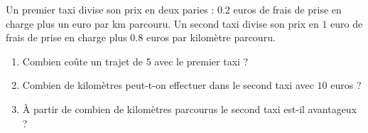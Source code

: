 
\begin{exercice}\label{exosmath-0086}

Un premier taxi divise son prix en deux paries : $0.2$ euros de frais de prise en charge plus un euro par km parcouru. Un second taxi divise son prix en $1$ euro de frais de prise en charge plus $0.8$ euros par kilomètre parcouru.

\begin{enumerate}
    \item
        Combien coûte un trajet de \unit{5}{\kilo\meter} avec le premier taxi ?
    \item
        Combien de kilomètres peut-t-on effectuer dans le second taxi avec \( 10\) euros ?
    \item
        À partir de combien de kilomètres parcourus le second taxi est-il avantageux ?
\end{enumerate}

\end{exercice}
